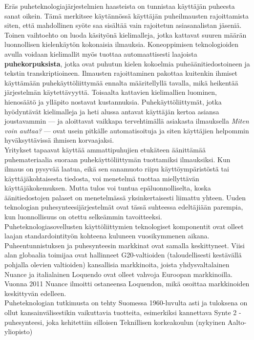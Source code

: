 \begin{multicols}{2}
Eräs puheteknologiajärjestelmien haasteista on tunnistaa käyttäjän
puheesta sanat oikein. Tämä merkitsee käytännössä käyttäjän
puheilmausten rajoittamista siten, että mahdollinen syöte saa sisältää vain rajoitetun
asiasanalistan jäseniä. Toinen vaihtoehto on luoda käsityönä kielimalleja,
jotka kattavat suuren määrän luonnollisen kielenkäytön kokonaisia
ilmauksia. Koneoppimisen teknologioiden avulla voidaan kielimallit
myös tuottaa automaattisesti laajoista \textbf{puhekorpuksista}, jotka ovat
puhutun kielen kokoelmia puheäänitiedostoineen ja tekstin
transkriptioineen. Ilmausten rajoittaminen pakottaa kuitenkin ihmiset
käyttämään puhekäyttöliittymää ennalta määritellyllä tavalla, mikä heikentää järjestelmän
käytettävyyttä. Toisaalta kattavien kielimallien luominen, hienosäätö
ja ylläpito nostavat kustannuksia. Puhekäyttöliittymät, jotka hyödyntävät kielimalleja ja
heti alussa antavat käyttäjän kertoa asiansa joustavammin —
ja aloittavat vaikkapa tervehtimällä asiakasta ilmauksella \textit{Miten voin auttaa?} — ovat usein
pitkälle automatisoituja ja siten käyttäjien helpommin hyväksyttävissä ihmisen korvaajaksi.\\
Yritykset tapaavat käyttää ammattipuhujien etukäteen äänittämää
puhemateriaalia suoraan puhekäyttöliittymän tuottamiksi ilmauksiksi. Kun
ilmaus on pysyvää laatua, eikä sen sanamuoto riipu käyttöympäristöstä tai
käyttäjäkohtaisesta tiedosta, voi menetelmä tuottaa miellyttävän
käyttäjäkokemuksen. Mutta tulos voi tuntua epäluonnolliselta, 
koska äänitiedostojen palaset on menetelmässä yksinkertaisesti liimattu yhteen. 
Uuden teknologian puhesynteesijärjestelmät ovat tässä suhteessa edeltäjiään parempia, 
kun luonnollisuus on otettu selkeämmin tavoitteeksi.\\
Puheteknologiasovellusten käyttöliittymien teknologiset komponentit
ovat olleet laajan standardointityön kohteena kuluneen vuosikymmenen
aikana. Puheentunnistuksen ja puhesynteesin markkinat ovat samalla keskittyneet. 
Viisi alan globaalia toimijaa ovat hallinneet G20-valtioiden 
(taloudellisesti kestävällä pohjalla olevien valtioiden) kansallisia markkinoita, 
joista yhdysvaltalainen Nuance ja italialainen Loquendo ovat olleet vahvoja Euroopan
markkinoilla. Vuonna 2011 Nuance ilmoitti ostaneensa Loquendon, mikä
osoittaa markkinoiden keskittyvän edelleen.\\
Puheteknologian tutkimusta on tehty Suomessa 1960-luvulta asti ja
tuloksena on ollut kansainvälisestikin vaikuttavia tuotteita,
esimerkiksi kannettava Synte 2 -puhesynteesi, joka kehitettiin
silloisen Teknillisen korkeakoulun (nykyinen Aalto-yliopisto)

\end{multicols}
